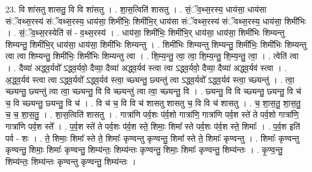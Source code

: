 \documentclass[17pt]{extarticle}
\begin{document}
23. वि शा॑सतु शासतु॒ वि वि शा॑सतु । . शा॒स॒त्विति॑ शासतु । . सं॒ॅव॒थ्स॒रस्य॒ धाय॑सा॒ धाय॑सा संॅवथ्स॒रस्य॑ संॅवथ्स॒रस्य॒ धाय॑सा॒ शिमी॑भिः॒ शिमी॑भि॒र् धाय॑सा संॅवथ्स॒रस्य॑ संॅवथ्स॒रस्य॒ धाय॑सा॒ शिमी॑भिः । . सं॒ॅव॒थ्स॒रस्येति॑ सं - व॒थ्स॒रस्य॑ । . धाय॑सा॒ शिमी॑भिः॒ शिमी॑भि॒र् धाय॑सा॒ धाय॑सा॒ शिमी॑भिः शिम्यन्तु शिम्यन्तु॒ शिमी॑भि॒र् धाय॑सा॒ धाय॑सा॒ शिमी॑भिः शिम्यन्तु । . शिमी॑भिः शिम्यन्तु शिम्यन्तु॒ शिमी॑भिः॒ शिमी॑भिः शिम्यन्तु त्वा त्वा शिम्यन्तु॒ शिमी॑भिः॒ शिमी॑भिः शिम्यन्तु त्वा । . शि॒म्य॒न्तु॒ त्वा॒ त्वा॒ शि॒म्य॒न्तु॒ शि॒म्य॒न्तु॒ त्वा॒ । . त्वेति॑ त्वा । . दैव्या॑ अद्ध्व॒र्यवो᳚ ऽद्ध्व॒र्यवो॒ दैव्या॒ दैव्या॑ अद्ध्व॒र्यव॑ स्त्वा त्वा ऽद्ध्व॒र्यवो॒ दैव्या॒ दैव्या॑ अद्ध्व॒र्यव॑ स्त्वा । . अ॒द्ध्व॒र्यव॑ स्त्वा त्वा ऽद्ध्व॒र्यवो᳚ ऽद्ध्व॒र्यव॑ स्त्वा॒ च्छ्यन्तु॒ छ्यन्तु॑ त्वा ऽद्ध्व॒र्यवो᳚ ऽद्ध्व॒र्यव॑ स्त्वा॒ च्छ्यन्तु॑ । . त्वा॒ च्छ्यन्तु॒ छ्यन्तु॑ त्वा त्वा॒ च्छ्यन्तु॒ वि वि च्छ्यन्तु॑ त्वा त्वा॒ च्छ्यन्तु॒ वि । . छ्यन्तु॒ वि वि च्छ्यन्तु॒ छ्यन्तु॒ वि च॑ च॒ वि च्छ्यन्तु॒ छ्यन्तु॒ वि च॑ । . वि च॑ च॒ वि वि च॑ शासतु शासतु च॒ वि वि च॑ शासतु । . च॒ शा॒स॒तु॒ शा॒स॒तु॒ च॒ च॒ शा॒स॒तु॒ । . शा॒स॒त्विति॑ शासतु । . गात्रा॑णि पर्व॒शः प॑र्व॒शो गात्रा॑णि॒ गात्रा॑णि पर्व॒श स्ते॑ ते पर्व॒शो गात्रा॑णि॒ गात्रा॑णि पर्व॒श स्ते᳚ । . प॒र्व॒श स्ते॑ ते पर्व॒शः प॑र्व॒श स्ते॒ शिमाः॒ शिमा᳚ स्ते पर्व॒शः प॑र्व॒श स्ते॒ शिमाः᳚ । . प॒र्व॒श इति॑ पर्व - शः । . ते॒ शिमाः॒ शिमा᳚ स्ते ते॒ शिमाः᳚ कृण्वन्तु कृण्वन्तु॒ शिमा᳚ स्ते ते॒ शिमाः᳚ कृण्वन्तु । . शिमाः᳚ कृण्वन्तु कृण्वन्तु॒ शिमाः॒ शिमाः᳚ कृण्वन्तु॒ शिम्य॑न्तः॒ शिम्य॑न्तः कृण्वन्तु॒ शिमाः॒ शिमाः᳚ कृण्वन्तु॒ शिम्य॑न्तः । . कृ॒ण्व॒न्तु॒ शिम्य॑न्तः॒ शिम्य॑न्तः कृण्वन्तु कृण्वन्तु॒ शिम्य॑न्तः । \newline
\end{document}
